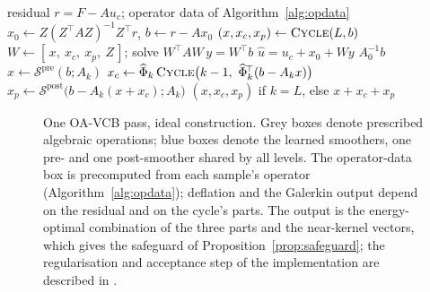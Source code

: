 \begin{algorithm}[tbp]
\caption{One OA-VCB pass, ideal construction (exact small solves; for the regularised implementation see
). $\mathcal{S}^{\mathrm{pre}},\mathcal{S}^{\mathrm{post}}$ are the learned smoothers
\eqref{eq:smoother}, shared by all levels. If $Z$ is empty, $x_0 = 0$; if $W$ is rank-deficient, $y$ is the
pseudoinverse solution, and $Wy$ is unique.}\label{alg:pass}
\begin{algorithmic}[1]
\Require residual $r = F - Au_c$; operator data of Algorithm~\ref{alg:opdata}
\State $x_0 \gets Z(Z^{\!\top}AZ)^{-1}Z^{\!\top}r$, \quad $b \gets r - Ax_0$ 
\State $(x, x_c, x_p) \gets \textsc{Cycle}(L, b)$ 
\State $W \gets [\,x,\ x_c,\ x_p,\ Z\,]$; solve $W^{\!\top}AW\,y = W^{\!\top}b$ 
\State \Return $\hat u = u_c + x_0 + Wy$
   \Return $A_0^{-1}b$ \EndIf
  \State $x \gets \mathcal{S}^{\mathrm{pre}}(b; A_k)$
  \State $x_c \gets \widehat\Phi_k\,\textsc{Cycle}\big(k-1,\ \widehat\Phi_k^{\!\top}(b - A_kx)\big)$
  \State $x_p \gets \mathcal{S}^{\mathrm{post}}\big(b - A_k(x + x_c); A_k\big)$
  \State \Return $(x, x_c, x_p)$ if $k = L$, else $x + x_c + x_p$
\EndFunction
\end{algorithmic}
\end{algorithm}
\begin{figure}[tbp]\centering
\resizebox{\linewidth}{!}{}
\caption{One OA-VCB pass, ideal construction. Grey boxes denote prescribed algebraic operations; blue boxes denote the learned
smoothers, one pre- and one post-smoother shared by all levels. The operator-data box is precomputed from each sample's
operator (Algorithm~\ref{alg:opdata}); deflation and the Galerkin output depend on the residual and on the cycle's parts. The
output is the energy-optimal combination of the three parts and the near-kernel vectors, which gives the safeguard of
Proposition~\ref{prop:safeguard}; the regularisation and acceptance step of the implementation are described in
.}
\label{fig:schematic}
\end{figure}

